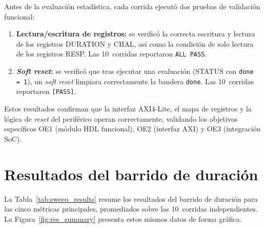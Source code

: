 Antes de la evaluación estadística, cada corrida ejecutó dos pruebas de
validación funcional:

\begin{enumerate}
  \item \textbf{Lectura/escritura de registros:} se verificó la correcta
    escritura y lectura de los registros DURATION y CHAL, así como la
    condición de solo lectura de los registros RESP. Las 10~corridas
    reportaron \texttt{ALL PASS}.

  \item \textbf{\textit{Soft reset}:} se verificó que tras ejecutar una
    evaluación (STATUS con \texttt{done\,=\,1}), un \textit{soft reset}
    limpiara correctamente la bandera \texttt{done}. Las 10~corridas
    reportaron \texttt{[PASS]}.
\end{enumerate}

Estos resultados confirman que la interfaz AXI4-Lite, el mapa de registros y
la lógica de \textit{reset} del periférico operan correctamente, validando
los objetivos específicos OE1 (módulo HDL funcional), OE2 (interfaz AXI) y
OE3 (integración SoC).

\section{Resultados del barrido de duración}
\label{sec:res_sweep}

La Tabla~\ref{tab:sweep_results} resume los resultados del barrido de
duración para las cinco métricas principales, promediados sobre las
10~corridas independientes. La Figura~\ref{fig:res_summary} presenta estos
mismos datos de forma gráfica.

